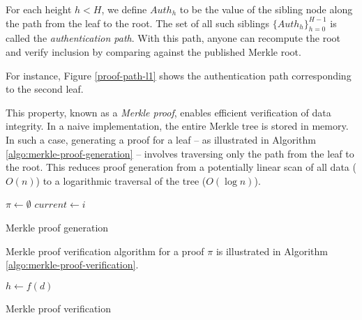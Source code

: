 For each height $h < H$, we define $Auth_h$ to be the value of the sibling node along the path from the leaf to the root. The set of all such siblings $\{Auth_h\}_{h=0}^{H-1}$ is called the \emph{authentication path}. With this path, anyone can recompute the root and verify inclusion by comparing against the published Merkle root.

For instance, Figure \ref{proof-path-l1} shows the authentication path corresponding to the second leaf.

This property, known as a \emph{Merkle proof}, enables efficient verification of data integrity. In a naive implementation, the entire Merkle tree is stored in memory. In such a case, generating a proof for a leaf -- as illustrated in Algorithm \ref{algo:merkle-proof-generation} -- involves traversing only the path from the leaf to the root. This reduces proof generation from a potentially linear scan of all data ($O(n)$) to a logarithmic traversal of the tree ($O(\log n)$).

\vspace{1em}
\begin{algorithm}[H]
\SetAlgoLined
\DontPrintSemicolon
{}
\BlankLine
$\pi \gets \emptyset$\;
$current \gets i$\;
\Return{$\pi$}\;
\caption{Merkle proof generation}
\label{algo:merkle-proof-generation}
\end{algorithm}

\vspace{1em}

Merkle proof verification algorithm for a proof $\pi$ is illustrated in Algorithm \ref{algo:merkle-proof-verification}.

 \vspace{1em}

\begin{algorithm}[H]
\SetAlgoLined
\DontPrintSemicolon
{}
\BlankLine
$h \gets f(d)$\;
\;
\caption{Merkle proof verification}
\label{algo:merkle-proof-verification}
\end{algorithm}

